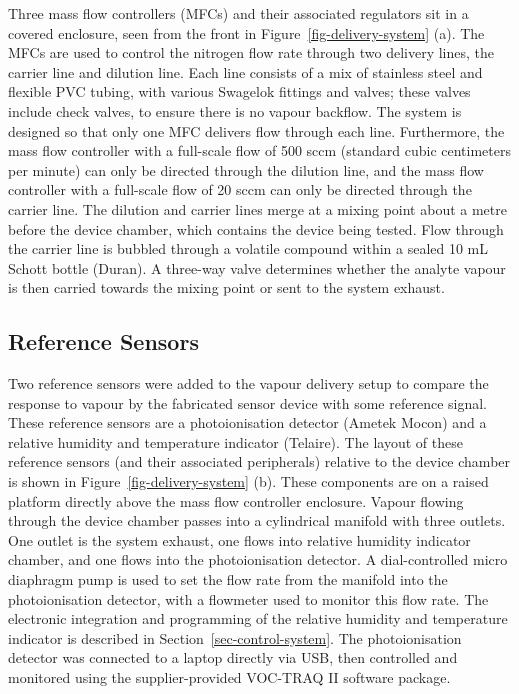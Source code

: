 \documentclass[
  a4paper,
]{scrbook}
\begin{document}
Three mass flow controllers (MFCs) and their associated regulators sit
in a covered enclosure, seen from the front in
Figure~\ref{fig-delivery-system} (a). The MFCs are used to control the
nitrogen flow rate through two delivery lines, the carrier line and
dilution line. Each line consists of a mix of stainless steel and
flexible PVC tubing, with various Swagelok fittings and valves; these
valves include check valves, to ensure there is no vapour backflow. The
system is designed so that only one MFC delivers flow through each line.
Furthermore, the mass flow controller with a full-scale flow of 500 sccm
(standard cubic centimeters per minute) can only be directed through the
dilution line, and the mass flow controller with a full-scale flow of 20
sccm can only be directed through the carrier line. The dilution and
carrier lines merge at a mixing point about a metre before the device
chamber, which contains the device being tested. Flow through the
carrier line is bubbled through a volatile compound within a sealed 10
mL Schott bottle (Duran). A three-way valve determines whether the
analyte vapour is then carried towards the mixing point or sent to the
system exhaust.

\hypertarget{sec-reference-sensors}{%
\subsection{Reference Sensors}\label{sec-reference-sensors}}

Two reference sensors were added to the vapour delivery setup to compare
the response to vapour by the fabricated sensor device with some
reference signal. These reference sensors are a photoionisation detector
(Ametek Mocon) and a relative humidity and temperature indicator
(Telaire). The layout of these reference sensors (and their associated
peripherals) relative to the device chamber is shown in
Figure~\ref{fig-delivery-system} (b). These components are on a raised
platform directly above the mass flow controller enclosure. Vapour
flowing through the device chamber passes into a cylindrical manifold
with three outlets. One outlet is the system exhaust, one flows into
relative humidity indicator chamber, and one flows into the
photoionisation detector. A dial-controlled micro diaphragm pump is used
to set the flow rate from the manifold into the photoionisation
detector, with a flowmeter used to monitor this flow rate. The
electronic integration and programming of the relative humidity and
temperature indicator is described in Section~\ref{sec-control-system}.
The photoionisation detector was connected to a laptop directly via USB,
then controlled and monitored using the supplier-provided VOC-TRAQ II
software package.
\end{document}
